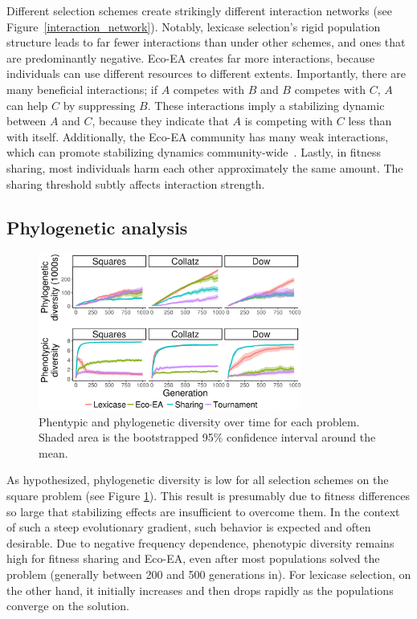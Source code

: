 Different selection schemes create strikingly different interaction networks (see Figure~\ref{interaction_network}). Notably, lexicase selection's rigid population structure leads to far fewer interactions than under other schemes, and ones that are predominantly negative. Eco-EA creates far more interactions, because individuals can use different resources to different extents. Importantly, there are many beneficial interactions; if $A$ competes with $B$ and $B$ competes with $C$, $A$ can help $C$ by suppressing $B$. %
These interactions imply a stabilizing dynamic between $A$ and $C$, because they indicate that $A$ is competing with $C$ less than with itself. Additionally, the Eco-EA community has many weak interactions, which can promote stabilizing dynamics community-wide~\cite{mccann_diversitystability_2000}. Lastly, in fitness sharing, most individuals harm each other approximately the same amount. The sharing threshold subtly affects interaction strength.


\subsection{Phylogenetic analysis}

\begin{figure}
\includegraphics[width=3.4in]{figs/time_all.png}
\caption{Phentypic and phylogenetic diversity over time for each problem. Shaded area is the bootstrapped 95\% confidence interval around the mean.}
\label{phylo_results}
\end{figure}

As hypothesized, phylogenetic diversity is low for all selection schemes on the square problem (see Figure \ref{phylo_results}). This result is presumably due to fitness differences so large that stabilizing effects are insufficient to overcome them. In the context of such a steep evolutionary gradient, such behavior is expected and often desirable. Due to negative frequency dependence, phenotypic diversity remains high for fitness sharing and Eco-EA, even after most populations solved the problem (generally between 200 and 500 generations in). %
For lexicase selection, on the other hand, it initially increases and then drops rapidly as the populations converge on the solution.

